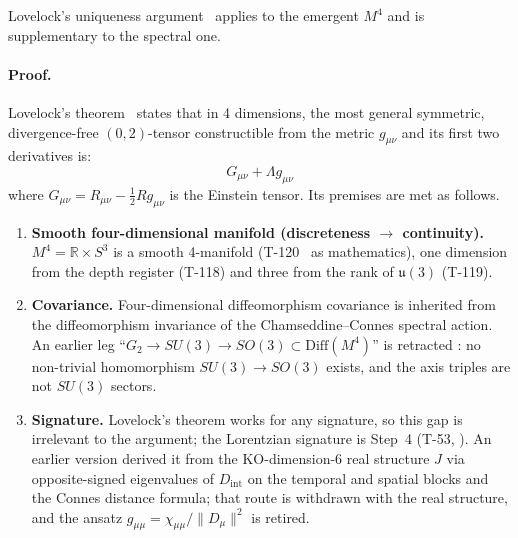 \begin{theorembox}
Lovelock's uniqueness argument~\cite{lovelock1971} applies to the emergent $M^4$ and is
supplementary to the spectral one.
\end{theorembox}

\paragraph{Proof.}
Lovelock's theorem~\cite{lovelock1971} states that in 4 dimensions, the most general
symmetric, divergence-free $(0,2)$-tensor constructible from the metric $g_{\mu\nu}$ and
its first two derivatives is:
\begin{equation}
  G_{\mu\nu} + \Lambda g_{\mu\nu}
  \label{eq:lovelock}
\end{equation}
where $G_{\mu\nu} = R_{\mu\nu} - \frac{1}{2}Rg_{\mu\nu}$ is the Einstein tensor.
Its premises are met as follows.

\begin{enumerate}[leftmargin=2em]
  \item \textbf{Smooth four-dimensional manifold (discreteness $\to$ continuity).}
        $M^4 = \mathbb{R}\times S^3$ is a smooth 4-manifold (T-120~ as
        mathematics), one dimension from the depth register (T-118) and three from the
        rank of $\mathfrak{u}(3)$ (T-119).

  \item \textbf{Covariance.} Four-dimensional diffeomorphism covariance is inherited from
        the diffeomorphism invariance of the Chamseddine--Connes spectral action. An
        earlier leg ``$G_2 \to SU(3) \to SO(3) \subset \mathrm{Diff}(M^4)$'' is retracted
        \status{$\times$}: no non-trivial homomorphism $SU(3) \to SO(3)$ exists, and the
        axis triples are not $SU(3)$ sectors.

  \item \textbf{Signature.} Lovelock's theorem works for any signature, so this gap is
        irrelevant to the argument; the Lorentzian signature is Step~4 (T-53, ).
        An earlier version derived it from the KO-dimension-6 real structure $J$ via
        opposite-signed eigenvalues of $D_{\mathrm{int}}$ on the temporal and spatial
        blocks and the Connes distance formula; that route is withdrawn with the real
        structure, and the ansatz $g_{\mu\mu} = \chi_{\mu\mu}/\|D_\mu\|^2$ is retired.
\end{enumerate}

